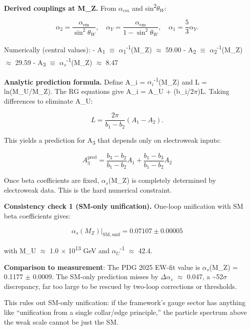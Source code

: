 \documentclass[11pt,a4paper]{article}
\theoremstyle{remark}
\begin{document}
\textbf{Derived couplings at M\_Z.} From $\alpha_{em}$ and sin\textsuperscript{2}$\theta_W$:

\[
\alpha_2 = \frac{\alpha_{\mathrm{em}}}{\sin^2\theta_W}, \quad
\alpha_Y = \frac{\alpha_{\mathrm{em}}}{1 - \sin^2\theta_W}, \quad
\alpha_1 = \frac{5}{3}\alpha_Y.
\]

Numerically (central values):
- A\textsubscript{1} \ensuremath{\equiv} \ensuremath{\alpha}\textsubscript{1}\textsuperscript{-1}(M\_Z) \ensuremath{\approx} 59.00
- A\textsubscript{2} \ensuremath{\equiv} \ensuremath{\alpha}\textsubscript{2}\textsuperscript{-1}(M\_Z) \ensuremath{\approx} 29.59
- A\textsubscript{3} \ensuremath{\equiv} $\alpha_s$\textsuperscript{-1}(M\_Z) \ensuremath{\approx} 8.47

\textbf{Analytic prediction formula.} Define A\_i = $\alpha_i$\textsuperscript{-1}(M\_Z) and
L = ln(M\_U/M\_Z). The RG equations give A\_i = A\_U + (b\_i/2\ensuremath{\pi})L. Taking
differences to eliminate A\_U:

\[
L = \frac{2\pi}{b_1 - b_2}(A_1 - A_2).
\]

This yields a prediction for A\textsubscript{3} that depends only on electroweak inputs:

\[
A_3^\mathrm{pred} = \frac{b_3 - b_2}{b_1 - b_2} A_1 + \frac{b_1 - b_3}{b_1 - b_2} A_2
\]

Once beta coefficients are fixed, $\alpha_s$(M\_Z) is completely determined by
electroweak data. This is the hard numerical constraint.

\textbf{Consistency check 1 (SM-only unification).} One-loop unification with SM beta
coefficients gives:

\[
\alpha_s(M_Z)|_\mathrm{SM,unif} = 0.07107 \pm 0.00005
\]

with M\_U \ensuremath{\approx} 1.0 \ensuremath{\times} 10\textsuperscript{13} GeV and $\alpha_U$\textsuperscript{-1} \ensuremath{\approx} 42.4.

\textbf{Comparison to measurement}: The PDG 2025 EW-fit value is
$\alpha_s$(M\_Z) = 0.1177 \ensuremath{\pm} 0.0009. The SM-only prediction misses by
\ensuremath{\Delta}$\alpha_s$ \ensuremath{\approx} 0.047, a \textasciitilde52\ensuremath{\sigma} discrepancy, far too large to be rescued
by two-loop corrections or thresholds.

This rules out SM-only unification: if the framework's gauge sector has anything
like ``unification from a single collar/edge principle,'' the particle spectrum
above the weak scale cannot be just the SM.
\end{document}
